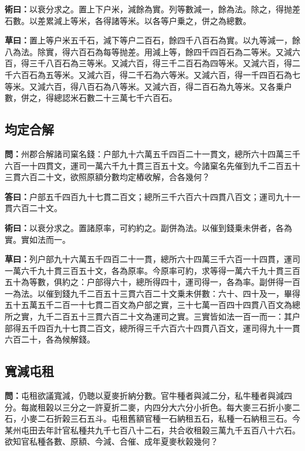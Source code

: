 \documentclass[11pt,a4paper]{article}
\newcommand{\Question}[1]{\par\noindent\textbf{\color{problemcolor}問：}#1\par}
\newcommand{\Answer}[1]{\par\noindent\textbf{\color{answercolor}答曰：}#1\par}
\newcommand{\Method}[1]{\par\noindent\textbf{\color{methodcolor}術曰：}#1\par}
\newcommand{\Working}[1]{\par\noindent\textbf{草曰：}#1\par}
\begin{document}
\Method{以衰分求之。置上下户米，減餘為實。列等數減一，餘為法。除之，得抛差石數。以差累減上等米，各得諸等米。以各等户乗之，併之為總數。}

\Working{置上等户米五千石，減下等户二百石，餘四千八百石為實。以九等減一，餘八為法。除實，得六百石為每等抛差。用減上等，餘四千四百石為二等米。又減六百，得三千八百石為三等米。又減六百，得三千二百石為四等米。又減六百，得二千六百石為五等米。又減六百，得二千石為六等米。又減六百，得一千四百石為七等米。又減六百，得八百石為八等米。又減六百，得二百石為九等米。又各乗户數，併之，得總認米石數二十三萬七千六百石。}

\subsection*{\color{sectioncolor}均定合解}

\Question{州郡合解諸司窠名錢：户部九十六萬五千四百二十一貫文，總所六十四萬三千六百一十四貫文，運司一萬六千九十貫三百五十文。今諸窠名先催到九千二百五十三貫六百二十文，欲照原額分數均定樁收解，合各幾何？}

\Answer{户部五千四百九十七貫二百文；總所三千六百六十四貫八百文；運司九十一貫六百二十文。}

\Method{以衰分求之。置諸原率，可約約之。副併為法。以催到錢乗未併者，各為實。實如法而一。}

\Working{列户部九十六萬五千四百二十一貫，總所六十四萬三千六百一十四貫，運司一萬六千九十貫三百五十文，各為原率。今原率可約，求等得一萬六千九十貫三百五十為等數，俱約之：户部得六十，總所得四十，運司得一，各為率。副併得一百一為法。以催到錢九千二百五十三貫六百二十文乗未併數：六十、四十及一，畢得五十五萬五千二百一十七貫二百文為户部之實，三十七萬一百四十四貫八百文為總所之實，九千二百五十三貫六百二十文為運司之實。三實皆如法一百一而一：其户部得五千四百九十七貫二百文，總所得三千六百六十四貫八百文，運司得九十一貫六百二十，各為候解錢。}

\subsection*{\color{sectioncolor}寬減屯租}

\Question{屯租欲議寬減，仍聴以夏麥折納分數。官牛種者與減二分，私牛種者與減四分。每嵗租榖以三分之一許夏折二麥，内四分大六分小折色。每大麥三石折小麥二石，小麥二石折榖三石五斗。屯租舊額官種一石納租五石，私種一石納租三石。今某州屯田去年計官私種共九千七百八十二石，共合收租榖三萬九千五百八十六石。欲知官私種各數、原額、今減、合催、成年夏麥秋榖幾何？}
\end{document}

